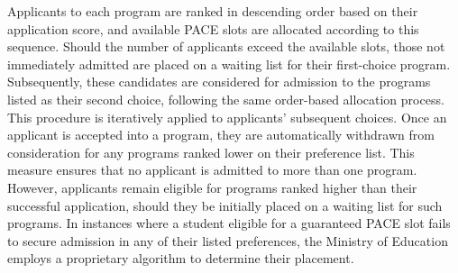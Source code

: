 Applicants to each program are ranked in descending order based on their application score, and available PACE slots are allocated according to this sequence. Should the number of applicants exceed the available slots, those not immediately admitted are placed on a waiting list for their first-choice program. Subsequently, these candidates are considered for admission to the programs listed as their second choice, following the same order-based allocation process. This procedure is iteratively applied to applicants' subsequent choices. Once an applicant is accepted into a program, they are automatically withdrawn from consideration for any programs ranked lower on their preference list. This measure ensures that no applicant is admitted to more than one program. However, applicants remain eligible for programs ranked higher than their successful application, should they be initially placed on a waiting list for such programs. In instances where a student eligible for a guaranteed PACE slot fails to secure admission in any of their listed preferences, the Ministry of Education employs a proprietary algorithm to determine their placement.\par 